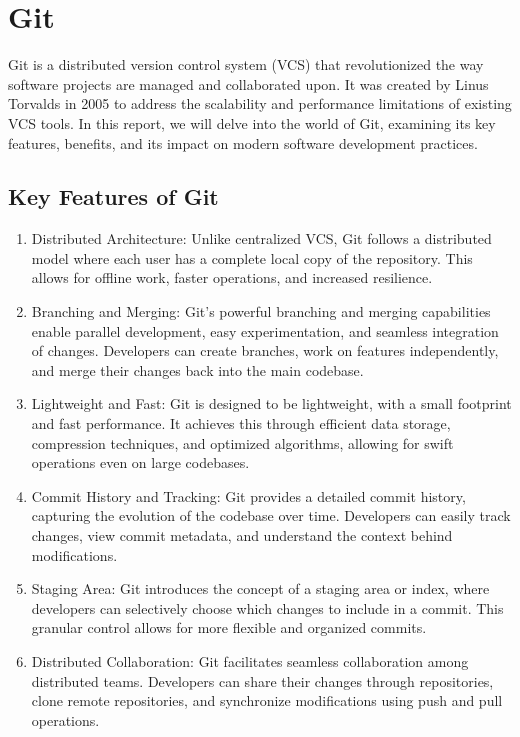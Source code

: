 \newpage
\section*{Git}

Git is a distributed version control system (VCS) that revolutionized the way software projects are managed and collaborated upon. It was created by Linus Torvalds in 2005 to address the scalability and performance limitations of existing VCS tools. In this report, we will delve into the world of Git, examining its key features, benefits, and its impact on modern software development practices.

\subsection*{Key Features of Git}

\begin{enumerate}
    \item Distributed Architecture: Unlike centralized VCS, Git follows a distributed model where each user has a complete local copy of the repository. This allows for offline work, faster operations, and increased resilience.

    \item Branching and Merging: Git's powerful branching and merging capabilities enable parallel development, easy experimentation, and seamless integration of changes. Developers can create branches, work on features independently, and merge their changes back into the main codebase.

    \item Lightweight and Fast: Git is designed to be lightweight, with a small footprint and fast performance. It achieves this through efficient data storage, compression techniques, and optimized algorithms, allowing for swift operations even on large codebases.

    \item Commit History and Tracking: Git provides a detailed commit history, capturing the evolution of the codebase over time. Developers can easily track changes, view commit metadata, and understand the context behind modifications.

    \item Staging Area: Git introduces the concept of a staging area or index, where developers can selectively choose which changes to include in a commit. This granular control allows for more flexible and organized commits.

    \item Distributed Collaboration: Git facilitates seamless collaboration among distributed teams. Developers can share their changes through repositories, clone remote repositories, and synchronize modifications using push and pull operations.
\end{enumerate}

